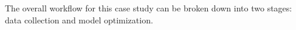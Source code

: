 \documentclass[book.tex]{subfiles}
\begin{document}







The overall workflow for this case study can be broken down into two stages: data collection and model optimization.

\end{document}
